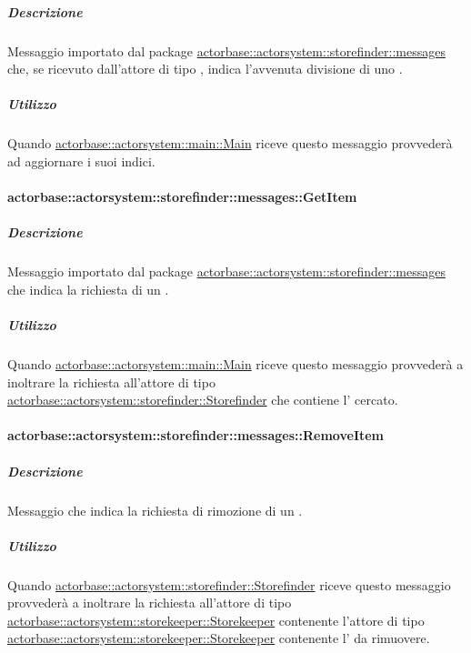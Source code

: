 \documentclass{scalatekids-article}
\begin{document}
\subparagraph{Descrizione}

Messaggio importato dal package \hyperref[sec:actorbase::actorsystem::storefinder::messages]{actorbase::\allowbreak{}actorsystem::\allowbreak{}storefinder::\allowbreak{}messages}
che, se ricevuto dall'attore di tipo ,
indica l'avvenuta divisione di uno .

\subparagraph{Utilizzo}

Quando \hyperref[sec:actorbase::actorsystem::main::Main]{actorbase::\allowbreak{}actorsystem::\allowbreak{}main::\allowbreak{}Main}
riceve questo messaggio provvederà ad aggiornare i suoi indici.

\paragraph{actorbase::actorsystem::storefinder::messages::GetItem}
\label{sec:actorbase::actorsystem::storefinder::messages::GetItem}

\subparagraph{Descrizione}

Messaggio importato dal package \hyperref[sec:actorbase::actorsystem::storefinder::messages]{actorbase::\allowbreak{}actorsystem::\allowbreak{}storefinder::\allowbreak{}messages}
che indica la richiesta di un .

\subparagraph{Utilizzo}

Quando \hyperref[sec:actorbase::actorsystem::main::Main]{actorbase::\allowbreak{}actorsystem::\allowbreak{}main::\allowbreak{}Main}
riceve questo messaggio provvederà a inoltrare la richiesta all'attore di tipo
\hyperref[sec:actorbase::actorsystem::storefinder::Storefinder]{actorbase::\allowbreak{}actorsystem::\allowbreak{}storefinder::\allowbreak{}Storefinder}
che contiene l' cercato.

\paragraph{actorbase::actorsystem::storefinder::messages::RemoveItem}
\label{sec:actorbase::actorsystem::storefinder::messages::RemoveItem}

\subparagraph{Descrizione}

Messaggio che indica la richiesta di rimozione di un .

\subparagraph{Utilizzo}

Quando \hyperref[sec:actorbase::actorsystem::storefinder::Storefinder]{actorbase::\allowbreak{}actorsystem::\allowbreak{}storefinder::\allowbreak{}Storefinder}
riceve questo messaggio provvederà a inoltrare la richiesta all'attore di tipo
\hyperref[sec:actorbase::actorsystem::storekeeper::Storekeeper]{actorbase::\allowbreak{}actorsystem::\allowbreak{}storekeeper::\allowbreak{}Storekeeper}
contenente l'attore di tipo
\hyperref[sec:actorbase::actorsystem::storekeeper::Storekeeper]{actorbase::\allowbreak{}actorsystem::\allowbreak{}storekeeper::\allowbreak{}Storekeeper}
contenente l' da rimuovere.
\end{document}
